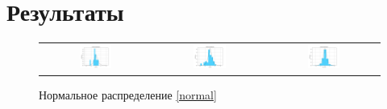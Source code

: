 ﻿\documentclass[12pt,a4paper]{article}
\begin{document}
\section {Результаты}
\begin{figure}[H]
    \centering
    \begin{tabular}{c c c}
        \includegraphics[height = 0.25\textheight, width = 0.31\textwidth]{Normal_10.png}
        & \includegraphics[height = 0.25\textheight, width = 0.31\textwidth]{Normal_50.png}
        & \includegraphics[height = 0.25\textheight, width = 0.31\textwidth]{Normal_1000.png}
    \end{tabular}
    \caption{Нормальное распределение \eqref{normal}}
    \label{fig:normal}
\end{figure}
\end{document}
